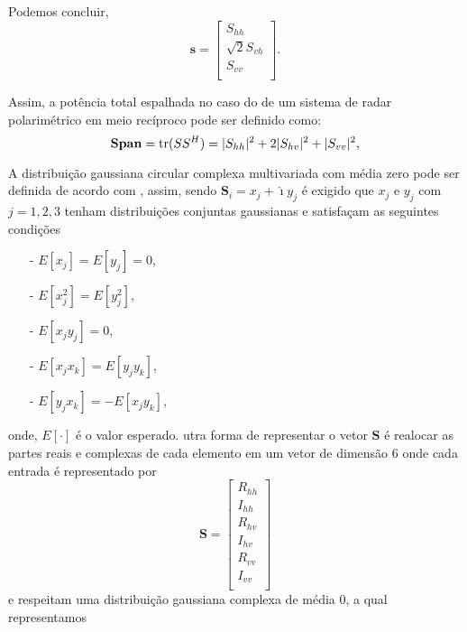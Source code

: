 Podemos concluir,
\begin{equation}\label{vetor_3d}
\mathbf{s} = \left[
\begin{array}{c}
	S_{hh}      \\
        \sqrt{2}S_{vh}     \\
	S_{vv}      \\
\end{array}
\right].
\end{equation}

Assim, a potência total espalhada no caso do de um sistema de radar polarimétrico em meio recíproco pode ser definido como:
\begin{equation}\label{span_geral}
\mathbf{Span} = \operatorname{tr}(SS^H)=|S_{hh}|^2+2|S_{hv}|^2+|S_{vv}|^2,
\end{equation}


A distribuição gaussiana circular complexa multivariada com média zero pode ser definida de acordo com \citet{goodman}, assim, sendo $\mathbf{S}_i= x_j+\hat{\imath}y_j$ é exigido que $x_j$ e $y_j$ com $j=1,2,3$ tenham distribuições conjuntas gaussianas e satisfaçam as seguintes condições 
\begin{itemize}
	\item[-] $E[x_j]=E[y_j]=0$,
	\item[-] $E[x_j^2]=E[y_j^2]$,
	\item[-] $E[x_jy_j]=0$,
	\item[-] $E[x_jx_k]=E[y_jy_k]$,
	\item[-] $E[y_jx_k]=-E[x_jy_k]$,
\end{itemize}
onde, $E[\cdot]$ é o valor esperado.
utra forma de representar o vetor $\mathbf{S}$ é realocar as partes reais e complexas de cada elemento em um vetor de dimensão $6$ onde cada entrada é representado por
\begin{equation}
\mathbf{S} = \left[
\begin{array}{c}
	R_{hh}     \\
    I_{hh}     \\
	R_{hv}     \\
	I_{hv}     \\
    R_{vv}     \\
	I_{vv}     \\
\end{array}
\right]
\end{equation}
e respeitam uma distribuição gaussiana complexa de média 0, a qual representamos 

